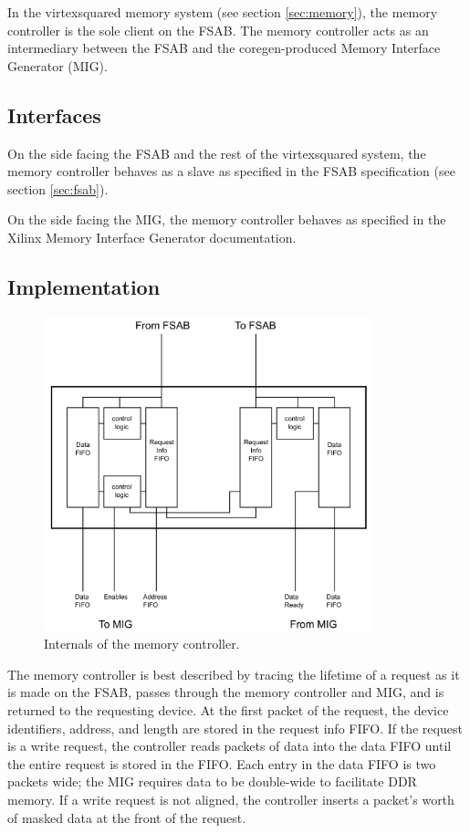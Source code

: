 \documentclass[10pt]{article}
\begin{document}
In the virtexsquared memory system (see section \ref{sec:memory}), the
memory controller is the sole client on the FSAB.  The memory controller
acts as an intermediary between the FSAB and the coregen-produced Memory
Interface Generator (MIG).

\subsection{Interfaces}

On the side facing the FSAB and the rest of the virtexsquared system, the
memory controller behaves as a slave as specified in the FSAB specification
(see section \ref{sec:fsab}).

On the side facing the MIG, the memory controller behaves as specified in
the Xilinx Memory Interface Generator documentation.

\subsection{Implementation}

\begin{figure}
  \centering
    \includegraphics[width=0.85\textwidth]{FSABMemory.pdf}
  \caption{Internals of the memory controller.} \label{fig:fsabmemory}
\end{figure}


The memory controller is best described by tracing the lifetime of a request
as it is made on the FSAB, passes through the memory controller and MIG, and
is returned to the requesting device. At the first packet of the request,
the device identifiers, address, and length are stored in the request info
FIFO. If the request is a write request, the controller reads packets of
data into the data FIFO until the entire request is stored in the FIFO. Each
entry in the data FIFO is two packets wide; the MIG requires data to be
double-wide to facilitate DDR memory. If a write request is not aligned, the
controller inserts a packet's worth of masked data at the front of the
request.
\end{document}
